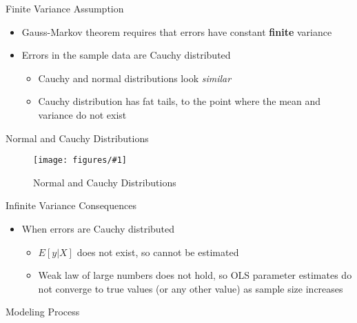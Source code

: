 \documentclass{beamer}
\newcommand{\img}[3]{\begin{figure}\centering\texttt{[image: figures/\#1]}\caption{#2}\end{figure}}
\begin{document}
\begin{frame}{Finite Variance Assumption}
\begin{itemize}
	\item Gauss-Markov theorem requires that errors have constant \textbf{finite} variance
	\item Errors in the sample data are Cauchy distributed
		\begin{itemize}
			\item Cauchy and normal distributions look \textit{similar}
			\item Cauchy distribution has fat tails, to the point where the mean and variance do not exist
		\end{itemize}
\end{itemize}
\end{frame}

\begin{frame}{Normal and Cauchy Distributions}
	\img{normal-cauchy.pdf}{Normal and Cauchy Distributions}{4}
\end{frame}

\begin{frame}{Infinite Variance Consequences}
\begin{itemize}
	\item When errors are Cauchy distributed
		\begin{itemize}
			\item $E[y|X]$ does not exist, so cannot be estimated
			\item Weak law of large numbers does not hold, so OLS parameter estimates do not converge to true values (or any other value) as sample size increases
		\end{itemize}
\end{itemize}
\end{frame}

\begin{frame}{Modeling Process}
\end{frame}
\end{document}
